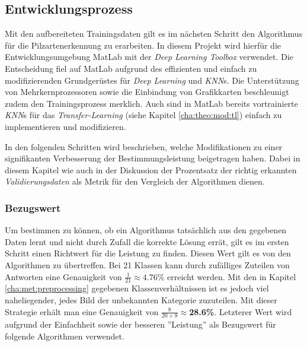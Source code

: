 
\subsection{Entwicklungsprozess}\label{cha:met:dev}
Mit den aufbereiteten Trainingsdaten gilt es im nächsten Schritt den Algorithmus für die Pilzartenerkennung zu erarbeiten. In diesem Projekt wird hierfür die Entwicklungsumgebung MatLab mit der \textit{Deep Learning Toolbox}\cite{matlab} verwendet. Die Entscheidung fiel auf MatLab aufgrund des effizienten und einfach zu modifizierenden Grundgerüstes für \textit{Deep Learning} und \textit{KNN}s. Die Unterstützung von Mehrkernprozessoren sowie die Einbindung von Grafikkarten beschleunigt zudem den Trainingsprozess merklich. Auch sind in MatLab bereits vortrainierte \textit{KNN}s für das \textit{Transfer-Learning} (siehe Kapitel \ref{cha:theo:mod:tl}) einfach zu implementieren und modifizieren.

In den folgenden Schritten wird beschrieben, welche Modifikationen zu einer signifikanten Verbesserung der Bestimmungsleistung beigetragen haben. Dabei in diesem Kapitel wie auch in der Diskussion der Prozentsatz der richtig erkannten \textit{Validierungsdaten} als Metrik für den Vergleich der Algorithmen dienen.

\subsubsection{Bezugswert}
Um bestimmen zu können, ob ein Algorithmus tatsächlich aus den gegebenen Daten lernt und nicht durch Zufall die korrekte Lösung errät, gilt es im ersten Schritt einen Richtwert für die Leistung zu finden. Diesen Wert gilt es von den Algorithmen zu übertreffen. Bei 21 Klassen kann durch zufälliges Zuteilen von Antworten eine Genauigkeit von $\frac{1}{21} \approx 4.76\%$ erreicht werden. Mit den in Kapitel \ref{cha:met:preprocessing} gegebenen Klassenverhältnissen ist es jedoch viel naheliegender, jedes Bild der unbekannten Kategorie zuzuteilen. Mit dieser Strategie erhält man eine Genauigkeit von $\frac{8}{20+8} \approx$\textbf{28.6\%}. Letzterer Wert wird aufgrund der Einfachheit sowie der besseren ''Leistung'' als Bezugswert für folgende Algorithmen verwendet.

